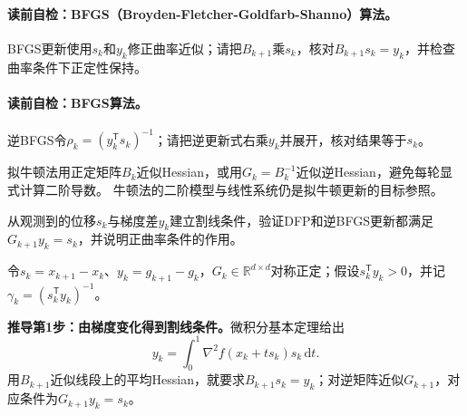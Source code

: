 \paragraph{读前自检：BFGS（Broyden-Fletcher-Goldfarb-Shanno）算法。}BFGS更新使用$s_k$和$y_k$修正曲率近似；请把$B_{k+1}$乘$s_k$，核对$B_{k+1}s_k=y_k$，并检查曲率条件下正定性保持。\par
\paragraph{读前自检：BFGS算法。}逆BFGS令$\rho_k=(y_k^{\mathsf T}s_k)^{-1}$；请把逆更新式右乘$y_k$并展开，核对结果等于$s_k$。\par

拟牛顿法用正定矩阵$B_k$近似Hessian，或用$G_k=B_k^{-1}$近似逆Hessian，避免每轮显式计算二阶导数。
牛顿法的二阶模型与线性系统仍是拟牛顿更新的目标参照。

\begin{derivationgoalbox}
从观测到的位移$s_k$与梯度差$y_k$建立割线条件，验证DFP和逆BFGS更新都满足$G_{k+1}y_k=s_k$，并说明正曲率条件的作用。
\end{derivationgoalbox}
\begin{derivationprepbox}
令$s_k=x_{k+1}-x_k$、$y_k=g_{k+1}-g_k$，$G_k\in\mathbb R^{d\times d}$对称正定；假设$s_k^{\mathsf T}y_k>0$，并记$\gamma_k=(s_k^{\mathsf T}y_k)^{-1}$。
\end{derivationprepbox}
\textbf{推导第1步：由梯度变化得到割线条件。}微积分基本定理给出
\[
y_k=\int_0^1\nabla^2f(x_k+t s_k)s_k\,\mathrm dt.
\]
用$B_{k+1}$近似线段上的平均Hessian，就要求$B_{k+1}s_k=y_k$；对逆矩阵近似$G_{k+1}$，对应条件为$G_{k+1}y_k=s_k$。

